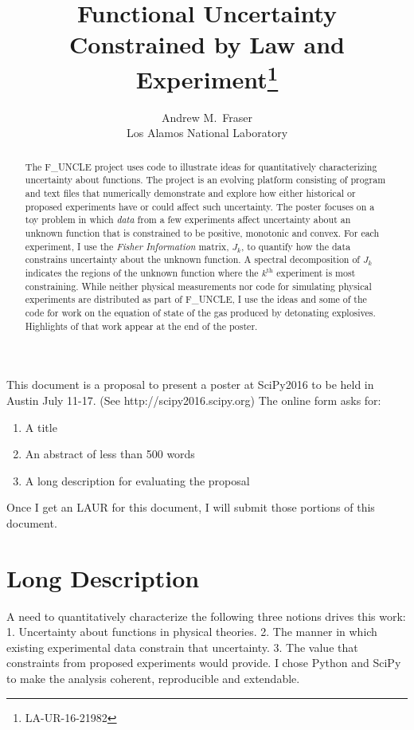 \documentclass[11pt]{article}
\title{Functional Uncertainty Constrained by Law and
  Experiment\footnote{LA-UR-16-21982}}
\author{Andrew M.\ Fraser\\Los Alamos National Laboratory}
\begin{document}
\maketitle
\begin{abstract}
  The F\_UNCLE project uses code to illustrate ideas for
  quantitatively characterizing uncertainty about functions.  The
  project is an evolving platform consisting of program and text files
  that numerically demonstrate and explore how either historical or
  proposed experiments have or could affect such uncertainty.  The
  poster focuses on a toy problem in which \emph{data} from a few
  experiments affect uncertainty about an unknown function that is
  constrained to be positive, monotonic and convex.  For each
  experiment, I use the \emph{Fisher Information} matrix, $J_k$, to
  quantify how the data constrains uncertainty about the unknown
  function.  A spectral decomposition of $J_k$ indicates the regions
  of the unknown function where the $k^{\text{th}}$ experiment is most
  constraining.  While neither physical measurements nor code for
  simulating physical experiments are distributed as part of F\_UNCLE,
  I use the ideas and some of the code for work on the equation of
  state of the gas produced by detonating explosives.  Highlights of
  that work appear at the end of the poster.
\end{abstract}

This document is a proposal to present a poster at SciPy2016 to be
held in Austin July 11-17.  (See http://scipy2016.scipy.org)  The
online form asks for:
\begin{enumerate}
\item A title
\item An abstract of less than 500 words
\item A long description for evaluating the proposal
\end{enumerate}
Once I get an LAUR for this document, I will submit those portions of
this document.

\section{Long Description}
\label{sec:long}

A need to quantitatively characterize the following three notions
drives this work: 1. Uncertainty about functions in physical
theories. 2. The manner in which existing experimental data constrain
that uncertainty.  3. The value that constraints from proposed
experiments would provide.  I chose Python and SciPy to make the
analysis coherent, reproducible and extendable.
\end{document}
